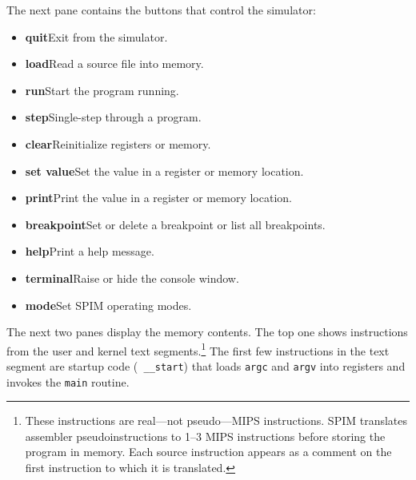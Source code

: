 \documentclass[11pt]{article}
\begin{document}
The next pane contains the buttons that control the simulator:
\begin{itemize}
  \item [] {\bf quit}\newline Exit from the simulator.

  \item [] {\bf load}\newline Read a source file into memory.

  \item [] {\bf run}\newline Start the program running.

  \item [] {\bf step}\newline Single-step through a program.

  \item [] {\bf clear}\newline Reinitialize registers or memory.

  \item [] {\bf set value}\newline Set the value in a register or
memory location.

  \item [] {\bf print}\newline Print the value in a register or memory
location.

  \item [] {\bf breakpoint}\newline Set or delete a breakpoint or list
all breakpoints.

  \item [] {\bf help}\newline Print a help message.

  \item [] {\bf terminal}\newline Raise or hide the console window.

  \item [] {\bf mode}\newline Set SPIM operating modes.
\end{itemize}

The next two panes display the memory contents.  The top one shows
instructions from the user and kernel text segments.\footnote{These
instructions are real---not pseudo---MIPS instructions.  SPIM
translates assembler pseudoinstructions to 1--3 MIPS instructions
before storing the program in memory.  Each source instruction appears
as a comment on the first instruction to which it is translated.} The
first few instructions in the text segment are startup code ({\tt
\_\_start}) that loads {\tt argc} and {\tt argv} into registers and
invokes the {\tt main} routine.
\end{document}
